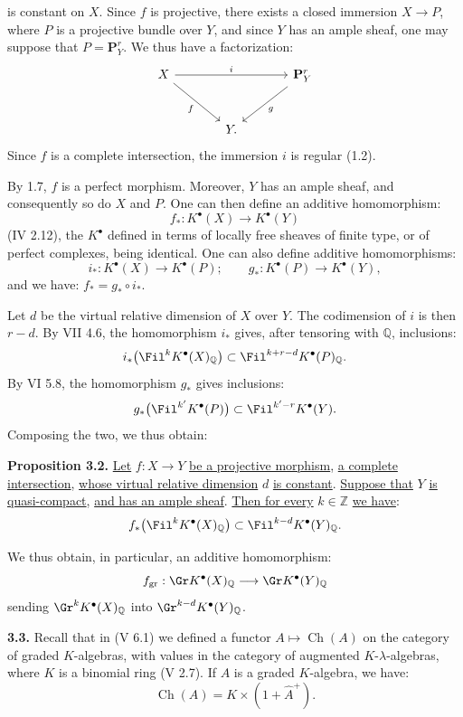 %
is constant on $X$. Since $f$ is projective, there exists a closed immersion $X\to P$, where $P$ is a projective bundle over $Y$, and since $Y$ has an ample sheaf, one may suppose that $P=\mathbf{P}^r_Y$. We thus have a factorization:
\[
\begin{tikzcd}[column sep=large,row sep=large]
X \arrow[rr,"i"] \arrow[dr,"f"'] && \mathbf{P}^r_Y \arrow[dl,"g"]\\
& Y. &
\end{tikzcd}
\]
Since $f$ is a complete intersection, the immersion $i$ is regular (1.2).

By 1.7, $f$ is a perfect morphism. Moreover, $Y$ has an ample sheaf, and consequently so do $X$ and $P$. One can then define an additive homomorphism:
\[
f_*:K^{\bullet}(X)\longrightarrow K^{\bullet}(Y)
\]
(IV 2.12), the $K^{\bullet}$ defined in terms of locally free sheaves of finite type, or of perfect complexes, being identical. One can also define additive homomorphisms:
\[
i_*:K^{\bullet}(X)\longrightarrow K^{\bullet}(P);
\qquad
 g_*:K^{\bullet}(P)\longrightarrow K^{\bullet}(Y),
\]
and we have: $f_*=g_*\circ i_*$.

Let $d$ be the virtual relative dimension of $X$ over $Y$. The codimension of $i$ is then $r-d$. By VII 4.6, the homomorphism $i_*$ gives, after tensoring with $\mathbb Q$, inclusions:
\[
i_*\bigl(\Fil^kK^{\bullet}(X)_{\mathbb Q}\bigr)
\subset
\Fil^{k+r-d}K^{\bullet}(P)_{\mathbb Q}.
\]
By VI 5.8, the homomorphism $g_*$ gives inclusions:
\[
g_*\bigl(\Fil^{k'}K^{\bullet}(P)\bigr)
\subset
\Fil^{k'-r}K^{\bullet}(Y).
\]
Composing the two, we thus obtain:

%
\textbf{Proposition 3.2.} \uline{Let} $f:X\to Y$ \uline{be a projective morphism}, \uline{a complete intersection}, \uline{whose virtual relative dimension} $d$ \uline{is constant}. \uline{Suppose that} $Y$ \uline{is quasi-compact}, \uline{and has an ample sheaf}. \uline{Then for every} $k\in\mathbb Z$ \uline{we have}:
\[
f_*\bigl(\Fil^kK^{\bullet}(X)_{\mathbb Q}\bigr)
\subset
\Fil^{k-d}K^{\bullet}(Y)_{\mathbb Q}.
\]

We thus obtain, in particular, an additive homomorphism:
\[
f_{\mathrm{gr}}:\Gr K^{\bullet}(X)_{\mathbb Q}\longrightarrow
\Gr K^{\bullet}(Y)_{\mathbb Q}
\]
sending $\Gr^kK^{\bullet}(X)_{\mathbb Q}$ into $\Gr^{k-d}K^{\bullet}(Y)_{\mathbb Q}$.

\textbf{3.3.} Recall that in (V 6.1) we defined a functor $A\longmapsto \operatorname{Ch}(A)$ on the category of graded $K$-algebras, with values in the category of augmented $K$-$\lambda$-algebras, where $K$ is a binomial ring (V 2.7). If $A$ is a graded $K$-algebra, we have:
\[
\operatorname{Ch}(A)=K\times(1+\widehat A^+).
\]

